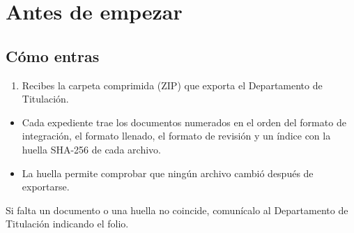 \section{Antes de empezar}
\subsection*{Cómo entras}
\begin{enumerate}
  \item Recibes la carpeta comprimida (ZIP) que exporta el Departamento de Titulación.
\end{enumerate}
\begin{tencuenta}
\begin{itemize}
  \item Cada expediente trae los documentos numerados en el orden del formato de integración, el formato llenado, el formato de revisión y un índice con la huella SHA-256 de cada archivo.
  \item La huella permite comprobar que ningún archivo cambió después de exportarse.
\end{itemize}
\end{tencuenta}
\begin{algosalemal}
Si falta un documento o una huella no coincide, comunícalo al Departamento de Titulación indicando el folio.
\end{algosalemal}
